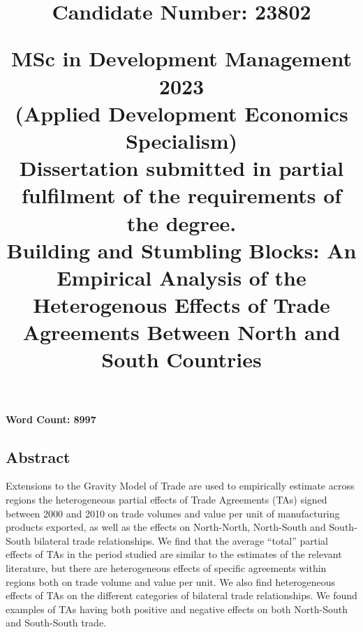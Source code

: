 \documentclass[12pt]{article}%
\title{
        \begin{flushright}
        \large \textbf{Candidate Number: 23802}
        \end{flushright}
        \vspace*{30mm}
        \begin{center}
        \large MSc in Development Management 2023 \\
        \large (Applied Development Economics Specialism) \\
        \vspace*{5mm}
        Dissertation submitted in partial fulfilment of the requirements of the degree. \\
        \vspace*{35mm}
        \large \textbf{Building and Stumbling Blocks: An Empirical Analysis of the Heterogenous Effects of Trade Agreements Between North and South Countries} \\
        \vspace*{20mm}
        \end{center}
    }%
\date{}%
\begin{document}
%
\normalsize%
%
\pagestyle{frontmatter}%
\maketitle%

\vfill
\begin{center}\textbf{Word Count: 8997}\end{center}
\newpage%
\vspace*{\fill}%
\begin{center}%
\begin{minipage}{0.8\textwidth}%
\begin{center}%
\section*{Abstract}%
\end{center}%
\justify%
Extensions to the Gravity Model of Trade are used to empirically estimate across regions the heterogeneous partial effects of Trade Agreements (TAs) signed between 2000 and 2010 on trade volumes and value per unit of manufacturing products exported, as well as the effects on North{-}North, North{-}South and South{-}South bilateral trade relationships. We find that the average “total” partial effects of TAs in the period studied are similar to the estimates of the relevant literature, but there are heterogeneous effects of specific agreements within regions both on trade volume and value per unit. We also find heterogeneous effects of TAs on the different categories of bilateral trade relationships. We found examples of TAs having both positive and negative effects on both North{-}South and South{-}South trade.%
\end{minipage}%
\end{center}%
\vspace*{\fill}%
\newpage%
\tableofcontents%
\newpage%
\end{document}
